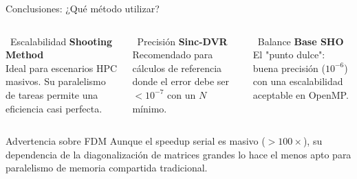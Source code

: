 \documentclass[aspectratio=169,10pt]{beamer}
\begin{document}
\begin{frame}{Conclusiones: ¿Qué método utilizar?}

\vspace{0.5cm}
\begin{columns}[T]

\begin{successbox}{\faAward\ Escalabilidad}
\textbf{Shooting Method}\\
\vspace{0.2cm}
\small
Ideal para escenarios HPC masivos. Su paralelismo de tareas permite una eficiencia casi perfecta.
\end{successbox}

\begin{physbox}{\faBullseye\ Precisión}
\textbf{Sinc-DVR}\\
\vspace{0.2cm}
\small
Recomendado para cálculos de referencia donde el error debe ser $< 10^{-7}$ con un $N$ mínimo.
\end{physbox}

\begin{conclusionbox}{\faBalanceScale\ Balance}
\textbf{Base SHO}\\
\vspace{0.2cm}
\small
El "punto dulce": buena precisión ($10^{-6}$) con una escalabilidad aceptable en OpenMP.
\end{conclusionbox}

\end{columns}

\vspace{0.8cm}
\begin{alertbox}{Advertencia sobre FDM}
\footnotesize
Aunque el speedup serial es masivo ($>100\times$), su dependencia de la diagonalización de matrices grandes lo hace el menos apto para paralelismo de memoria compartida tradicional.
\end{alertbox}

\end{frame}
\end{document}
